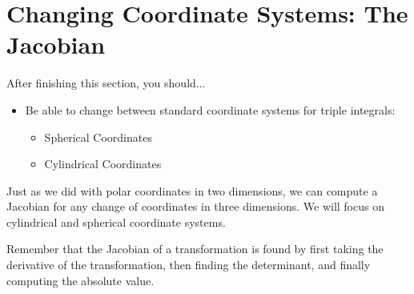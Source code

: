 \documentclass[10pt,]{book}
\theoremstyle{plain}
\theoremstyle{definition}
\theoremstyle{definition}
\theoremstyle{definition}
\theoremstyle{definition}
\theoremstyle{definition}
\numberwithin{equation}{section}
\begin{document}
\section[{Changing Coordinate Systems: The Jacobian}]{Changing Coordinate Systems: The Jacobian}\label{section-46}
After finishing this section, you should...%
\leavevmode%
\begin{itemize}[label=\textbullet]
\item{}Be able to change between standard coordinate systems for triple integrals:%
%
\begin{itemize}[label=$\circ$]
\item{}Spherical Coordinates%
\item{}Cylindrical Coordinates%
\end{itemize}
\end{itemize}
Just as we did with polar coordinates in two dimensions, we can compute a Jacobian for any change of coordinates in three dimensions. We will focus on cylindrical and spherical coordinate systems.%
\par
Remember that the Jacobian of a transformation is found by first taking the derivative of the transformation, then finding the determinant, and finally computing the absolute value.%
\end{document}
